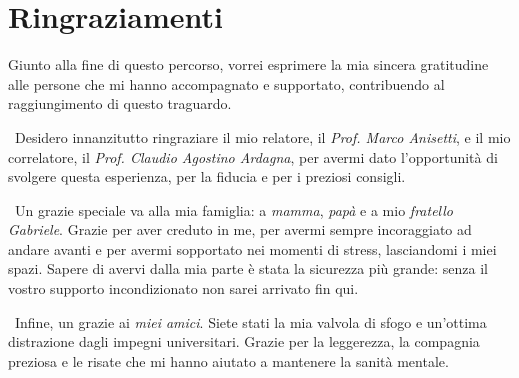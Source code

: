 \chapter*{Ringraziamenti}

Giunto alla fine di questo percorso, vorrei esprimere la mia sincera gratitudine alle persone che mi hanno accompagnato e supportato, contribuendo al raggiungimento di questo traguardo.

\
Desidero innanzitutto ringraziare il mio relatore, il \textit{Prof. Marco Anisetti}, e il mio correlatore, il \textit{Prof. Claudio Agostino Ardagna}, per avermi dato l'opportunità di svolgere questa esperienza, per la fiducia e per i preziosi consigli.

\
Un grazie speciale va alla mia famiglia: a \textit{mamma}, \textit{papà} e a mio \textit{fratello Gabriele}.
Grazie per aver creduto in me, per avermi sempre incoraggiato ad andare avanti e per avermi sopportato nei momenti di stress, lasciandomi i miei spazi.
Sapere di avervi dalla mia parte è stata la sicurezza più grande: senza il vostro supporto incondizionato non sarei arrivato fin qui.

\
Infine, un grazie ai \textit{miei amici}. Siete stati la mia valvola di sfogo e un'ottima distrazione dagli impegni universitari. Grazie per la leggerezza, la compagnia preziosa e le risate che mi hanno aiutato a mantenere la sanità mentale.
